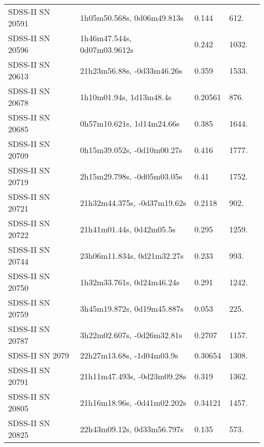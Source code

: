 \begin{longtable}{lllll}
 SDSS-II SN 20591 &     1h05m50.568s, 0d06m49.813s &    0.144 &           612. &    \citet{2011ApJ...738..162S} \\
 SDSS-II SN 20596 &    1h46m47.544s, 0d07m03.9612s &    0.242 &          1032. &    \citet{2011ApJ...738..162S} \\
 SDSS-II SN 20613 &     21h23m56.88s, -0d33m46.26s &    0.359 &          1533. &    \citet{2011ApJ...738..162S} \\
 SDSS-II SN 20678 &        1h10m01.94s, 1d13m48.4s &  0.20561 &           876. &    \citet{2016SDSSD.C...0000:} \\
 SDSS-II SN 20685 &      0h57m10.621s, 1d14m24.66s &    0.385 &          1644. &    \citet{2011ApJ...738..162S} \\
 SDSS-II SN 20709 &     0h15m39.052s, -0d10m00.27s &    0.416 &          1777. &    \citet{2011ApJ...738..162S} \\
 SDSS-II SN 20719 &     2h15m29.798s, -0d05m03.05s &     0.41 &          1752. &    \citet{2011ApJ...738..162S} \\
 SDSS-II SN 20721 &    21h32m44.375s, -0d37m19.62s &   0.2118 &           902. &    \citet{2011ApJ...738..162S} \\
 SDSS-II SN 20722 &       21h41m01.44s, 0d42m05.5s &    0.295 &          1259. &    \citet{2010ApJ...713.1026D} \\
 SDSS-II SN 20744 &     23h06m11.834s, 0d21m32.27s &    0.233 &           993. &    \citet{2010ApJ...713.1026D} \\
 SDSS-II SN 20750 &      1h32m33.761s, 0d24m46.24s &    0.291 &          1242. &    \citet{2010ApJ...713.1026D} \\
 SDSS-II SN 20759 &     3h45m19.872s, 0d19m45.887s &    0.053 &           225. &    \citet{2011ApJ...738..162S} \\
 SDSS-II SN 20787 &     3h22m02.607s, -0d26m32.81s &   0.2707 &          1157. &    \citet{2011ApJ...738..162S} \\
  SDSS-II SN 2079 &      22h27m13.68s, -1d04m03.9s &  0.30654 &          1308. &    \citet{2016SDSSD.C...0000:} \\
 SDSS-II SN 20791 &    21h11m47.493s, -0d23m09.28s &    0.319 &          1362. &    \citet{2010ApJ...713.1026D} \\
 SDSS-II SN 20805 &    21h16m18.96s, -0d41m02.202s &  0.34121 &          1457. &    \citet{2016SDSSD.C...0000:} \\
 SDSS-II SN 20825 &     22h43m09.12s, 0d33m56.797s &    0.135 &           573. &    \citet{2011ApJ...738..162S} \\

\end{longtable}
